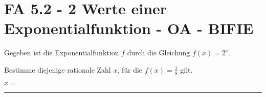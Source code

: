 \section{FA 5.2 - 2 Werte einer Exponentialfunktion - OA - BIFIE}

\begin{beispiel}[FA 5.2]{1} %
Gegeben ist die Exponentialfunktion $f$ durch die Gleichung $f(x)=2^x$.

\leer

Bestimme diejenige rationale Zahl $x$, für die $f(x)=\frac{1}{8}$ gilt.

\leer

$x=$\rule{5cm}{0.3pt}

\end{beispiel}